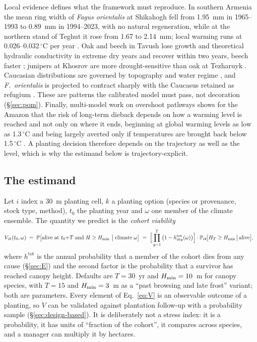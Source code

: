 Local evidence defines what the framework must reproduce. In southern Armenia the mean ring width of \emph{Fagus orientalis} at Shikahogh fell from 1.95~mm in 1965--1993 to 0.89~mm in 1994--2023, with no natural regeneration, while at the northern stand of Teghut it rose from 1.67 to 2.14~mm; local warming runs at 0.026--0.032\,$^\circ$C per year \citep{Stepanyan2026}. Oak and beech in Tavush lose growth and theoretical hydraulic conductivity in extreme dry years and recover within two years, beech faster \citep{Voss2025}; junipers at Khosrov are more drought-sensitive than oak at Tezharuyk \citep{OpalaOwczarek2021}. Caucasian distributions are governed by topography and water regime \citep{Pshegusov2022}, and \emph{F.~orientalis} is projected to contract sharply with the Caucasus retained as refugium \citep{Dagtekin2020}. These are patterns the calibrated model must pass, not decoration (\S\ref{sec:pom}). Finally, multi-model work on overshoot pathways shows for the Amazon that the risk of long-term dieback depends on how a warming level is reached and not only on where it ends, beginning at global warming levels as low as 1.3\,$^\circ$C and being largely averted only if temperatures are brought back below 1.5\,$^\circ$C \citep{Munday2025}. A planting decision therefore depends on the trajectory as well as the level, which is why the estimand below is trajectory-explicit.

\subsection{The estimand}\label{sec:estimand}
Let $i$ index a 30~m planting cell, $k$ a planting option (species or provenance, stock type, method), $t_0$ the planting year and $\omega$ one member of the climate ensemble. The quantity we predict is the \emph{cohort viability}
\begin{equation}\label{eq:V}
V_{ik}(t_0,\omega)\;=\;\Prob\big[\text{alive at }t_0{+}T\ \text{and}\ H\ge\Hmin\ \big|\ \text{climate }\omega\big]\;=\;\Big[\prod_{y=1}^{T}\big(1-h^{\mathrm{tot}}_{iky}(\omega)\big)\Big]\cdot\Prob_{ik}\!\big[H_T\ge\Hmin\,\big|\,\text{alive}\big],
\end{equation}
where $h^{\mathrm{tot}}$ is the annual probability that a member of the cohort dies from any cause (\S\ref{sec:E}) and the second factor is the probability that a survivor has reached canopy height. Defaults are $T=30$~yr and $H_{\min}=10$~m for canopy species, with $T=15$ and $H_{\min}=3$~m as a ``past browsing and late frost'' variant; both are parameters. Every element of Eq.~\eqref{eq:V} is an observable outcome of a planting, so $V$ can be validated against plantation follow-up with a probability sample (\S\ref{sec:design-based}). It is deliberately not a stress index: it is a probability, it has units of ``fraction of the cohort'', it compares across species, and a manager can multiply it by hectares.

